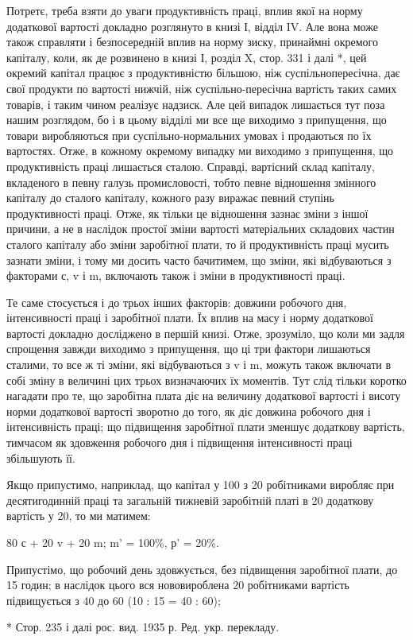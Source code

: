 Потретє, треба взяти до уваги продуктивність праці, вплив
якої на норму додаткової вартості докладно розглянуто в книзі І,
відділ IV. Але вона може також справляти і безпосередній
вплив на норму зиску, принаймні окремого капіталу, коли, як
де розвинено в книзі І, розділ X, стор. 331 і далі *, цей окремий
капітал працює з продуктивністю більшою, ніж суспільнопересічна,
дає свої продукти по вартості нижчій, ніж суспільно-пересічна
вартість таких самих товарів, і таким чином
реалізує надзиск. Але цей випадок лишається тут поза нашим
розглядом, бо і в цьому відділі ми все ще виходимо з припущення,
що товари виробляються при суспільно-нормальних
умовах і продаються по їх вартостях. Отже, в кожному окремому
випадку ми виходимо з припущення, що продуктивність
праці лишається сталою. Справді, вартісний склад капіталу,
вкладеного в певну галузь промисловості, тобто певне відношення
змінного капіталу до сталого капіталу, кожного разу
виражає певний ступінь продуктивності праці. Отже, як тільки
це відношення зазнає зміни з іншої причини, а не в наслідок
простої зміни вартості матеріальних складових частин сталого
капіталу або зміни заробітної плати, то й продуктивність праці
мусить зазнати зміни, і тому ми досить часто бачитимем, що
зміни, які відбуваються з факторами с, v і m, включають також
і зміни в продуктивності праці.

Те саме стосується і до трьох інших факторів: довжини робочого
дня, інтенсивності праці і заробітної плати. Їх вплив
на масу і норму додаткової вартості докладно досліджено в першій
книзі. Отже, зрозуміло, що коли ми задля спрощення завжди
виходимо з припущення, що ці три фактори лишаються сталими,
то все ж ті зміни, які відбуваються з v і m, можуть також включати
в собі зміну в величині цих трьох визначаючих їх моментів.
Тут слід тільки коротко нагадати про те, що заробітна плата
діє на величину додаткової вартості і висоту норми додаткової
вартості зворотно до того, як діє довжина робочого дня і інтенсивність
праці; що підвищення заробітної плати зменшує додаткову
вартість, тимчасом як здовження робочого дня і підвищення
інтенсивності праці збільшують її.

Якщо припустимо, наприклад, що капітал у 100 з 20 робітниками
виробляє при десятигодинній праці та загальній тижневій
заробітній платі в 20 додаткову вартість у 20, то ми
матимем:

80 с + 20 v + 20 m; m' = 100\%, р' = 20\%.

Припустімо, що робочий день здовжується, без підвищення
заробітної плати, до 15 годин; в наслідок цього вся нововироблена
20 робітниками вартість підвищується з 40 до 60 (10 : 15 = 40 : 60);

* Стор. 235 і далі рос. вид. 1935 р. Ред. укр. перекладу.
